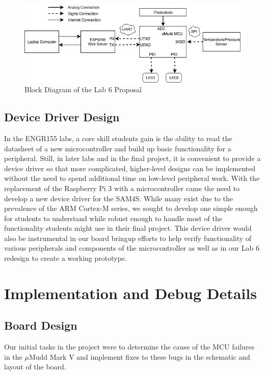\documentclass[12pt]{article}
\begin{document}
    \begin{figure}[h]
        \label{lab6_wifi_block}
        \begin{center}
            \includegraphics[width=12cm]{blockdiagramwifi.png}
            \caption{Block Diagram of the Lab 6 Proposal}
        \end{center}
    \end{figure}    
    
    
    
\subsection{Device Driver Design}
    In the ENGR155 labs, a core skill students gain is the ability to read the datasheet of a new microcontroller and build up basic functionality for a peripheral. Still, in later labs and in the final project, it is convenient to provide a device driver so that more complicated, higher-level designs can be implemented without the need to spend additional time on low-level peripheral work. With the replacement of the Raspberry Pi 3 with a microcontroller came the need to develop a new device driver for the SAM4S. While many exist due to the prevalence of the ARM Cortex-M series, we sought to develop one simple enough for students to understand while robust enough to handle most of the functionality students might use in their final project. This device driver would also be instrumental in our board bringup efforts to help verify functionality of various peripherals and components of the microcontroller as well as in our Lab 6 redesign to create a working prototype.


\section{Implementation and Debug Details}
\subsection{Board Design}

Our initial tasks in the project were to determine the cause of the MCU failures in the $\mu$Mudd Mark V and implement fixes to these bugs in the schematic and layout of the board. 
\end{document}
